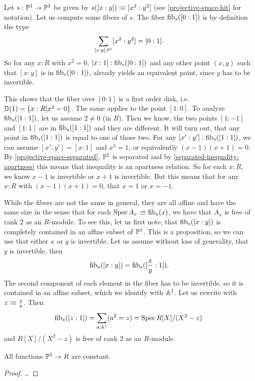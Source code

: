 \begin{example}
  Let $s:\mathbb{P}^1\to \mathbb{P}^1$ be given by $s([x:y])\vcentcolon\mspace{-1.2mu}\equiv [x^2:y^2]$
  (see \cref{projective-space-hit} for notation).
  Let us compute some fibers of $s$. The fiber $\mathrm{fib}_s([0:1])$ is
  by definition the type
  \[
    \sum_{[x:y]:\bP^1}[x^2:y^2]=[0:1]\rlap{.}
  \]
  So for any $x:R$ with $x^2=0$, $[x:1]:\mathrm{fib}_s([0:1])$  and
  any other point $(x,y)$ such that $[x:y]$ is in $\mathrm{fib}_s([0:1])$,
  already yields an equivalent point, since $y$ has to be invertible.

  This shows that the fiber over $[0:1]$ is a first order disk, i.e. $\mathbb{D}(1)=\{x:R|x^2=0\}$.
  The same applies to the point $[1:0]$.
  To analyze $\mathrm{fib}_s([1:1])$, let us assume $2\neq 0$ (in $R$).
  Then we know, the two points $[1:-1]$ and $[1:1]$ are in $\mathrm{fib}_s([1:1])$ and they are different.
  It will turn out, that any point in $\mathrm{fib}_s([1:1])$ is equal to one of those two.
  For any $[x':y']:\mathrm{fib}_s([1:1])$, we can assume $[x':y']=[x:1]$ and $x^2=1$, or equivalently $(x-1)(x+1)=0$.
  By \cref{projective-space-separated}, $\mathbb{P}^1$ is separated and by \cref{separated-inequality-apartness}
  this means that inequality is an apartness relation.
  So for each $x:R$, we know $x-1$ is invertible or $x+1$ is invertible.
  But this means that for any $x:R$ with $(x-1)(x+1)=0$, that $x=1$ or $x=-1$.

  While the fibers are not the same in general,
  they are all affine and have the same size in the sense that for each $\operatorname{Spec} A_x\vcentcolon\mspace{-1.2mu}\equiv \mathrm{fib}_s(x)$,
  we have that $A_x$ is free of rank 2 as an $R$-module.
  To see this, let us first note,
  that $\mathrm{fib}_s([x:y])$ is completely contained in an affine subset of $\mathbb{P}^1$.
  This is a proposition, so we can use that either $x$ or $y$ is invertible.
  Let us assume without loss of generality, that $y$ is invertible,
  then
  \[
    \fib_s([x:y])=\fib_s([\frac{x}{y}:1])
    \rlap{.}
  \]
  The second component of each element in the fiber has to be invertible,
  so it is contained in an affine subset, which we identify with $\mathbb{A}^1$.
  Let us rewrite with $z\vcentcolon\mspace{-1.2mu}\equiv \frac{x}{y}$.
  Then
  \[
    \mathrm{fib}_s([z:1])=\sum_{a:\mathbb{A}^1}(a^2=z)=\operatorname{Spec} R[X]/(X^2-z)
  \]
  and $R[X]/(X^2-z)$ is free of rank 2 as an $R$-module.
\end{example}

\begin{lemma}
  All functions $\mathbb{P}^1 \to R$ are constant.
\end{lemma}

\begin{proof}
  \dots
\end{proof}

